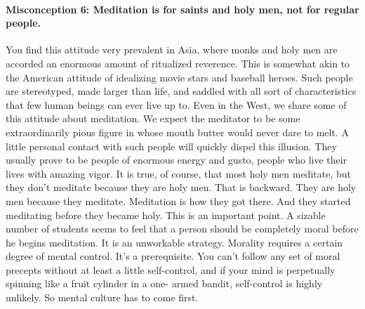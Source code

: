 \paragraph*{Misconception 6: Meditation is for saints and holy men, not for regular people.}

You find this attitude very prevalent in Asia, where monks and holy men are
accorded an enormous amount of ritualized reverence.
This is somewhat akin to the American attitude of idealizing movie stars and
baseball heroes. Such people are stereotyped, made larger than life, and saddled
with all sort of characteristics that few human beings can ever live up to. Even
in the West, we share some of this attitude about meditation. We expect the
meditator to be some extraordinarily pious figure in whose mouth butter would
never dare to melt. A little personal contact with such people will quickly
dispel this illusion. They usually prove to be people of enormous energy and
gusto, people who live their lives with amazing vigor. It is true, of course,
that most holy men meditate, but they don't meditate because they are holy men.
That is backward. They are holy men because they meditate.
Meditation is how they got there. And they started meditating before they became
holy. This is an important point. A sizable number of students seems to feel
that a person should be completely moral before he begins meditation. It is an
unworkable strategy. Morality requires a certain degree of mental control. It's
a prerequisite. You can't follow any set of moral precepts without at least a
little self-control, and if your mind is perpetually spinning like a fruit
cylinder in a one- armed bandit, self-control is highly unlikely. So mental
culture has to come first.

